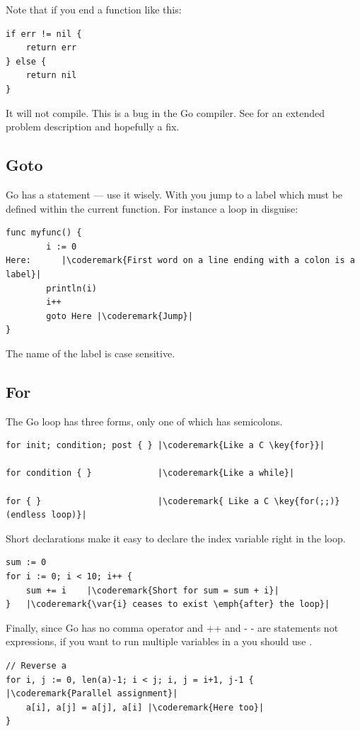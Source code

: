 \begin{lbar}
Note that if you end a function like this:
\begin{lstlisting}
if err != nil {
    return err
} else {
    return nil
}
\end{lstlisting}
It will not compile. This is a bug in the Go compiler. See
\cite{go_issue_65} for an extended problem description and
hopefully a fix.
\end{lbar}

\subsection{Goto}
Go has a  statement --- use it wisely. With 
you jump to a  label which must be defined within the current function.
For instance a loop in disguise:
\begin{lstlisting}
func myfunc() {
        i := 0                                                                                      
Here:	   |\coderemark{First word on a line ending with a colon is a label}|
        println(i)
        i++ 
        goto Here |\coderemark{Jump}|
}
\end{lstlisting}
The name of the label is case sensitive.

\subsection{For}
\label{sec:for}
The Go  loop has three forms, only one of
which has semicolons.
\begin{lstlisting}
for init; condition; post { } |\coderemark{Like a C \key{for}}|

for condition { }             |\coderemark{Like a while}|

for { }                       |\coderemark{ Like a C \key{for(;;)} (endless loop)}|
\end{lstlisting}
Short declarations make it easy to declare the index variable right in the loop.
\begin{lstlisting}
sum := 0
for i := 0; i < 10; i++ {
    sum += i	|\coderemark{Short for sum = sum + i}|
}   |\coderemark{\var{i} ceases to exist \emph{after} the loop}|
\end{lstlisting}
Finally, since Go has no comma operator and ++ and - - are statements not
expressions, if you want to run multiple variables in a  you should
use .
\begin{lstlisting}
// Reverse a
for i, j := 0, len(a)-1; i < j; i, j = i+1, j-1 { |\coderemark{Parallel assignment}|
    a[i], a[j] = a[j], a[i] |\coderemark{Here too}|
}
\end{lstlisting}

